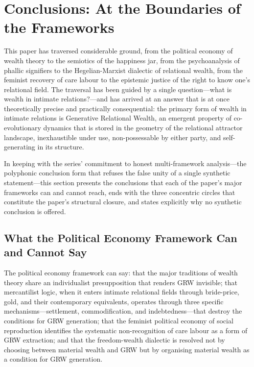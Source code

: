 \section{Conclusions: At the Boundaries of the Frameworks}
\label{p15:sec:conclusions}

\noindent
This paper has traversed considerable ground, from the political economy of wealth theory to the semiotics of the happiness jar, from the psychoanalysis of phallic signifiers to the Hegelian-Marxist dialectic of relational wealth, from the feminist recovery of care labour to the epistemic justice of the right to know one's relational field. The traversal has been guided by a single question---what is wealth in intimate relations?---and has arrived at an answer that is at once theoretically precise and practically consequential: the primary form of wealth in intimate relations is Generative Relational Wealth, an emergent property of co-evolutionary dynamics that is stored in the geometry of the relational attractor landscape, inexhaustible under use, non-possessable by either party, and self-generating in its structure.

In keeping with the series' commitment to honest multi-framework analysis---the polyphonic conclusion form that refuses the false unity of a single synthetic statement---this section presents the conclusions that each of the paper's major frameworks can and cannot reach, ends with the three concentric circles that constitute the paper's structural closure, and states explicitly why no synthetic conclusion is offered.

\subsection{What the Political Economy Framework Can and Cannot Say}
\label{p15:subsec:conc_pe}

\noindent
The political economy framework can say: that the major traditions of wealth theory share an individualist presupposition that renders GRW invisible; that mercantilist logic, when it enters intimate relational fields through bride-price, gold, and their contemporary equivalents, operates through three specific mechanisms---settlement, commodification, and indebtedness---that destroy the conditions for GRW generation; that the feminist political economy of social reproduction identifies the systematic non-recognition of care labour as a form of GRW extraction; and that the freedom-wealth dialectic is resolved not by choosing between material wealth and GRW but by organising material wealth as a condition for GRW generation.

